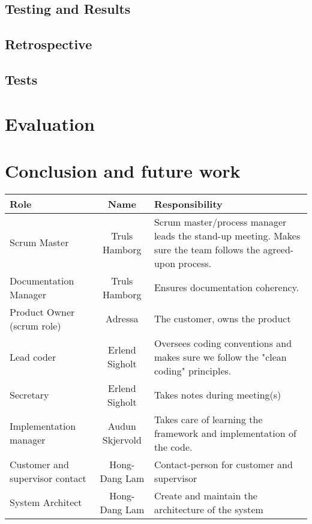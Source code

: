 \documentclass[12pt, a4paper]{article}
\begin{document}
\subsection{Testing and Results}
\subsection{Retrospective}


\subsection{Tests}

\section{Evaluation}


\section{Conclusion and future work}

\begin{center}
  \begin{tabular}{| l  c  b{5cm}|}
    \hline
    Role & Name & Responsibility \\ \hline 
    Scrum Master & Truls Hamborg &  Scrum master/process manager leads the stand-up meeting. Makes sure the team follows the agreed-upon process. \\ \hline
    Documentation Manager & Truls Hamborg &  Ensures documentation coherency. \\ \hline
    Product Owner (scrum role) & Adressa & The customer, owns the product\\ \hline
    Lead coder & Erlend Sigholt & Oversees coding conventions and makes sure we follow the "clean coding" principles. \\ \hline
    Secretary & Erlend Sigholt & Takes notes during meeting(s) \\ \hline
    Implementation manager & Audun Skjervold & Takes care of learning the framework and implementation of the code.\\ \hline
    Customer and supervisor contact & Hong-Dang Lam & Contact-person for customer and supervisor \\ \hline
    System Architect & Hong-Dang Lam & Create and maintain the architecture of the system \\
    \hline
  \end{tabular}
\end{center}


 
 
\end{document}
